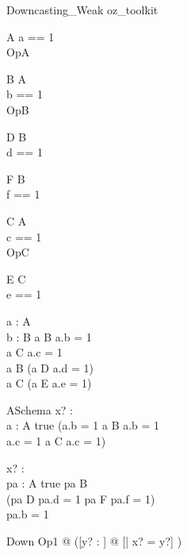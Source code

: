 \begin{zsection}
  \SECTION Downcasting\_Weak \parents oz\_toolkit
\end{zsection}

\begin{class}{A}
 a == 1\\
 OpA 
\end{class}

\begin{class}{B}
 A\\
 b == 1\\
 OpB \sdef [x? : \nat]
\end{class}

\begin{class}{D}
 B\\
 d == 1
\end{class}

\begin{class}{F}
 B\\
 f == 1
\end{class}


\begin{class}{C}
 A\\
 c == 1\\
 OpC \sdef [x? : \nat]
\end{class}

\begin{class}{E}
  C\\
  e == 1
\end{class}

\begin{axdef}
  a : \poly A\\
  b : B
\where
  a \in B \implies a.b = 1\\
  a \in C \implies a.c = 1\\
  a \in \poly B \implies (a \in D \implies a.d = 1)\\
  a \in \poly C \implies (a \in E \implies a.e = 1)\\
\end{axdef}

\begin{schema}{ASchema}
  x? : \nat\\
  a : \poly A
\where
  true \land
  (a.b = 1 \land a \in B \land a.b = 1 \lor\\
   a.c = 1 \land a \in C \land a.c = 1)
\end{schema}

\begin{axdef}
  x? : \nat\\
  pa : \poly A
\where
  true \land pa \in \poly B\\
  (pa \in D \land pa.d = 1 \lor pa \in F \land pa.f = 1) \\
  pa.b = 1
\end{axdef}

\begin{class}{Down}
 Op1 \sdef [x? : \nat] @ ([y? : \nat] @ [| x? = y?] )
\end{class}
